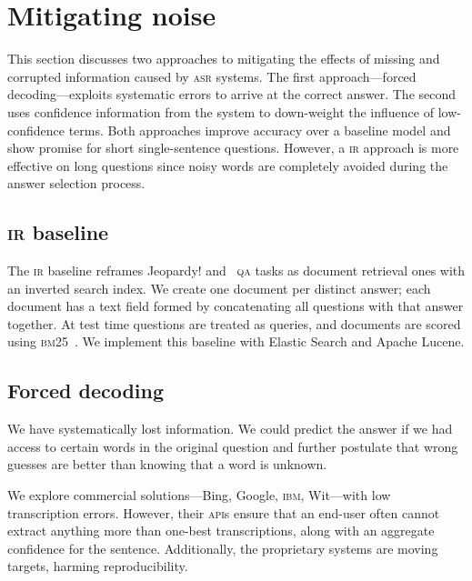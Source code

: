 \section{Mitigating noise}
\label{sec:models}






This section discusses two approaches to mitigating the effects of
missing and corrupted information caused by \textsc{asr} systems.  The
first approach---forced decoding---exploits systematic errors to arrive at the correct answer.
The second uses confidence information from the \asr{} system to
down-weight the influence of low-confidence terms.  Both approaches improve accuracy over a baseline \dan{} model and show promise for short single-sentence questions.   However, a \textsc{ir} approach is more effective on long questions since noisy words are completely avoided during the answer selection process.  


\subsection{\textsc{ir} baseline}
The \textsc{ir} baseline reframes Jeopardy! and \qb~\textsc{qa} tasks as document retrieval ones with an inverted search index.  We create one document per distinct answer; each document has a text field formed by concatenating all questions with that answer together.  At test time questions are treated as queries, and documents are scored using \textsc{bm25}~\cite{ramos2003using,robertson2009probabilistic}.
We implement this baseline with Elastic Search and Apache Lucene.

\subsection{Forced decoding}
\label{sec:forced-decoding}

We have systematically lost information.  We could predict the answer if we had access to certain words in the original question and further postulate that wrong guesses are better than knowing that a word is unknown.





We explore commercial solutions---Bing, Google,
\textsc{ibm}, Wit---with low transcription
errors.  However, their \textsc{api}s ensure that an end-user
often cannot extract anything more than one-best transcriptions, along
with an aggregate confidence for the sentence.  Additionally, the
proprietary systems are moving targets, harming reproducibility.

